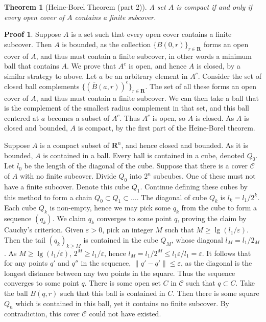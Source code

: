 \documentclass[12pt]{amsbook}
\theoremstyle{plain}
\newtheorem{theorem}{Theorem}
\theoremstyle{definition}
\newtheorem*{prf}{Proof}
\begin{document}
\begin{theorem}[Heine-Borel Theorem (part 2)]
  A set $A$ is compact if and only if every open cover of $A$ contains a finite subcover.
\end{theorem}
\begin{prf}
  Suppose $A$ is a set such that every open cover contains a finite subcover. Then $A$ is bounded, as the collection $\{B(0,r)\}_{r \in \mathbf{R}}$ forms an open cover of $A$, and thus must contain a finite subcover, in other words a minimum ball that contains $A$. We prove that $A^c$ is open, and hence $A$ is closed, by a similar strategy to above. Let $a$ be an arbitrary element in $A^c$. Consider the set of closed ball complements $\{(\overline{B}(a,r))^c\}_{r \in \mathbf{R}}$. The set of all these forms an open cover of $A$, and thus must contain a finite subcover. We can then take a ball that is the complement of the smallest radius complement in that set, and this ball centered at $a$ becomes a subset of $A^c$. Thus $A^c$ is open, so $A$ is closed. As $A$ is closed and bounded, $A$ is compact, by the first part of the Heine-Borel theorem.

  Suppose $A$ is a compact subset of $\mathbf{R}^n$, and hence closed and bounded. As it is bounded, $A$ is contained in a ball. Every ball is contained in a cube, denoted $Q_0$. Let $l_0$ be the length of the diagonal of the cube. Suppose that there is a cover $\mathcal{C}$ of $A$ with no finite subcover. Divide $Q_0$ into $2^n$ subcubes. One of these must not have a finite subcover. Denote this cube $Q_1$. Continue defining these cubes by this method to form a chain $Q_0 \subset Q_1 \subset \dots$. The diagonal of cube $Q_k$ is $l_k = l_1/2^k$. Each cube $Q_k$ is non-empty, hence we may pick some $q_k$ from the cube to form a sequence $(q_k)$. We claim $q_k$ converges to some point $q$, proving the claim by Cauchy's criterion. Given $\varepsilon > 0$, pick an integer $M$ such that $M \geq \lg(l_1/\varepsilon)$. Then the tail $(q_k)_{k \geq M}$ is contained in the cube $Q_M$, whose diagonal $l_M = l_1/2_M$. As $M \geq \lg(l_1/\varepsilon)$, $2^M \geq l_1/\varepsilon$, hence $l_M = l_1/2^M \leq l_1 \varepsilon/l_1 = \varepsilon$. It follows that for any points $q'$ and $q''$ in the sequence, $\| q' - q' \| \leq \varepsilon$, as the diagonal is the longest distance between any two points in the square. Thus the sequence converges to some point $q$. There is some open set $C$ in $\mathcal{C}$ such that $q \subset C$. Take the ball $B(q,r)$ such that this ball is contained in $C$. Then there is some square $Q_n$ which is contained in this ball, yet it contains no finite subcover. By contradiction, this cover $\mathcal{C}$ could not have existed.
\end{prf}
\end{document}
